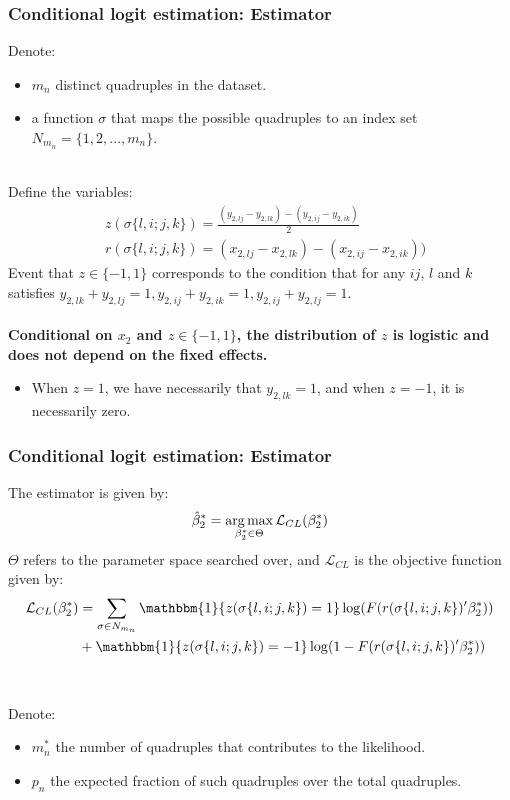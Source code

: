 \begin{frame}[label = Jochmans]
    \frametitle{{Conditional logit estimation: Estimator}}
    Denote: 
    \begin{itemize}
        \item $m_n$ distinct quadruples in the dataset. 
        \item a function $\sigma$ that maps the possible quadruples to an index set $N_{m_n} = \{ 1,2,...,m_n\}$. \\~\\ 
    \end{itemize} 
    Define the variables:
    \begin{align*}
        &z(\sigma\{l,i;j,k\}) = \frac{(y_{2,lj} - y_{2,lk}) - (y_{2,ij} - y_{2,ik})}{2} \\
        &r(\sigma\{l,i;j,k\}) = (x_{2,lj} - x_{2,lk}) - (x_{2,ij} - x_{2,ik}))
    \end{align*}
    Event that $z \in \{-1,1\}$ corresponds to the condition that for any $ij$, $l$ and $k$ satisfies $ y_{2,lk} + y_{2,lj} = 1, y_{2,ij} + y_{2,ik} = 1, y_{2,ij} + y_{2,lj} = 1$. \\~\\ 
    \textbf{Conditional on $x_2$ and $z \in \{-1,1\}$, the distribution of $z$ is logistic and does not depend on the fixed effects.}
    \begin{itemize}
        \item When $z=1$, we have necessarily that $y_{2,lk} = 1$, and when $z=-1$, it is necessarily zero.
    \end{itemize}
\end{frame}

\begin{frame}
    \frametitle{{Conditional logit estimation: Estimator}}
    The estimator is given by:
    \begin{align*}
        \hat{\beta}_2^* = \operatorname*{arg\max}_{\beta_2^* \in \Theta} \mathcal{L}_{CL}(\beta_2^*)
    \end{align*}
    \noindent $\Theta$ refers to the parameter space searched over, and $\mathcal{L}_{CL}$ is the objective function given by:
\begin{align*}
    \mathcal{L}_{CL}(\beta_2^*) &= \sum_{\sigma \in N_{m_n}} \mathbbm{1}\{ z(\sigma\{l,i;j,k\}) = 1\} \log (F(r(\sigma\{l,i;j,k\})'\beta_2^*)) \\ &+ \mathbbm{1}\{ z(\sigma\{l,i;j,k\}) = -1\} \log (1 - F(r(\sigma\{l,i;j,k\})'\beta_2^*))
\end{align*}  \\~\\ 
Denote:
\begin{itemize}
    \item $m_n^*$ the number of quadruples that contributes to the likelihood.
    \item $p_n$ the expected fraction of such quadruples over the total quadruples.
\end{itemize}
\end{frame}

